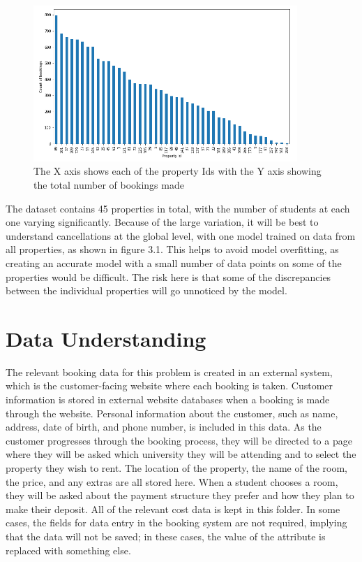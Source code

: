 \begin{figure}[hbt!]
 \includegraphics[width=10cm]{figures/bookings_by_property.png}
 \caption{The X axis shows each of the property Ids with the Y axis showing the total number of bookings made}
\end{figure}


The dataset contains 45 properties in total, with the number of students at each one varying significantly. Because of the large variation, it will be best to understand cancellations at the global level, with one model trained on data from all properties, as shown in figure 3.1. This helps to avoid model overfitting, as creating an accurate model with a small number of data points on some of the properties would be difficult. The risk here is that some of the discrepancies between the individual properties will go unnoticed by the model.

\section{Data Understanding}

The relevant booking data for this problem is created in an external system, which is the customer-facing website where each booking is taken. Customer information is stored in external website databases when a booking is made through the website. Personal information about the customer, such as name, address, date of birth, and phone number, is included in this data. As the customer progresses through the booking process, they will be directed to a page where they will be asked which university they will be attending and to select the property they wish to rent. The location of the property, the name of the room, the price, and any extras are all stored here. When a student chooses a room, they will be asked about the payment structure they prefer and how they plan to make their deposit. All of the relevant cost data is kept in this folder. In some cases, the fields for data entry in the booking system are not required, implying that the data will not be saved; in these cases, the value of the attribute is replaced with something else.

